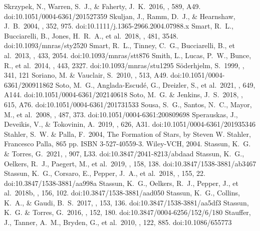 \documentclass[twocolumn,tighten,twocolappendix]{aastex631}
\begin{document}
\begin{thebibliography}{}
 Skrzypek, N., Warren, S.~J., \& Faherty, J.~K.\ 2016, \aap, 589, A49. doi:10.1051/0004-6361/201527359
 Skuljan, J., Ramm, D.~J., \& Hearnshaw, J.~B.\ 2004, \mnras, 352, 975. doi:10.1111/j.1365-2966.2004.07988.x
 Smart, R.~L., Bucciarelli, B., Jones, H.~R.~A., et al.\ 2018, \mnras, 481, 3548. doi:10.1093/mnras/sty2520
 Smart, R.~L., Tinney, C.~G., Bucciarelli, B., et al.\ 2013, \mnras, 433, 2054. doi:10.1093/mnras/stt876
 Smith, L., Lucas, P.~W., Bunce, R., et al.\ 2014, \mnras, 443, 2327. doi:10.1093/mnras/stu1295
 S{\"o}derhjelm, S.\ 1999, \aap, 341, 121
 Soriano, M. \& Vauclair, S.\ 2010, \aap, 513, A49. doi:10.1051/0004-6361/200911862
 Soto, M.~G., Anglada-Escud{\'e}, G., Dreizler, S., et al.\ 2021, \aap, 649, A144. doi:10.1051/0004-6361/202140618
 Soto, M.~G. \& Jenkins, J.~S.\ 2018, \aap, 615, A76. doi:10.1051/0004-6361/201731533
 Sousa, S.~G., Santos, N.~C., Mayor, M., et al.\ 2008, \aap, 487, 373. doi:10.1051/0004-6361:200809698
 Sperauskas, J., Deveikis, V., \& Tokovinin, A.\ 2019, \aap, 626, A31. doi:10.1051/0004-6361/201935346
 Stahler, S.~W. \& Palla, F.\ 2004, The Formation of Stars, by Steven W. Stahler, Francesco Palla, 865 pp. ISBN 3-527-40559-3. Wiley-VCH, 2004.
 Stassun, K.~G. \& Torres, G.\ 2021, \apjl, 907, L33. doi:10.3847/2041-8213/abdaad
 Stassun, K.~G., Oelkers, R.~J., Paegert, M., et al.\ 2019, \aj, 158, 138. doi:10.3847/1538-3881/ab3467
 Stassun, K.~G., Corsaro, E., Pepper, J.~A., et al.\ 2018, \aj, 155, 22. doi:10.3847/1538-3881/aa998a
 Stassun, K.~G., Oelkers, R.~J., Pepper, J., et al.\ 2018b, \aj, 156, 102. doi:10.3847/1538-3881/aad050
 Stassun, K.~G., Collins, K.~A., \& Gaudi, B.~S.\ 2017, \aj, 153, 136. doi:10.3847/1538-3881/aa5df3
 Stassun, K.~G. \& Torres, G.\ 2016, \aj, 152, 180. doi:10.3847/0004-6256/152/6/180
 Stauffer, J., Tanner, A.~M., Bryden, G., et al.\ 2010, \pasp, 122, 885. doi:10.1086/655773

\end{thebibliography}
\end{document}
